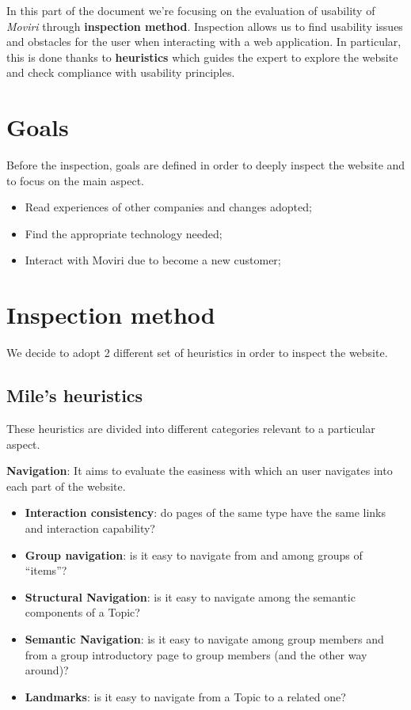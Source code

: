In this part of the document we're focusing on the evaluation of usability of \textit{Moviri} through \textbf{inspection method}. Inspection allows us to find usability issues and obstacles for the user when interacting with a web application. In particular, this is done thanks to \textbf{heuristics} which guides the expert to explore the website and check compliance with usability principles.
\section{Goals}
Before the inspection, goals are defined in order to deeply inspect the website and to focus on the main aspect. 
\begin{itemize}
\item Read experiences of other companies and changes adopted;
\item Find the appropriate technology needed;
\item Interact with Moviri due to become a new customer;
\end{itemize}
\section{Inspection method}

We decide to adopt 2 different set of heuristics in order to inspect the website. 

\subsection{Mile's heuristics}
These heuristics are divided into different categories relevant to a particular aspect.

\textbf{Navigation}: It aims to evaluate the easiness with which an user navigates into each part of the website.
\begin{itemize} 
\item \textbf{Interaction consistency}: do pages of the same type have the same links and interaction capability?
\item \textbf{Group navigation}: is it easy to navigate from and among groups of
“items”?
\item \textbf{Structural Navigation}: is it easy to navigate among the semantic components of a Topic?
\item \textbf{Semantic Navigation}: is it easy to navigate among group members and from a group introductory page to group members (and the other way around)?
\item \textbf{Landmarks}: is it easy to navigate from a Topic to a related one?
\end{itemize}

